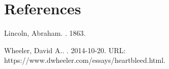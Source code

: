 \documentclass[12pt]{article}
\begin{document}
\section{References}




\begin{thebibliography}{99} %



Lincoln, Abraham. 
. 1863.

Wheeler, David A..
. 2014-10-20.
\newblock URL: https://www.dwheeler.com/essays/heartbleed.html.






\end{thebibliography}

\clearpage
\end{document}
